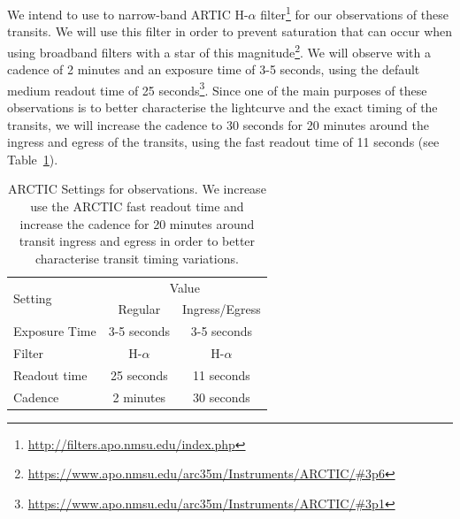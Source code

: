 \documentclass[twocolumn]{aastex631}
\begin{document}
We intend to use to narrow-band ARTIC H-$\alpha$ filter\footnote{\url{http://filters.apo.nmsu.edu/index.php}} for our observations of these transits. We will use this filter in order to prevent saturation that can occur when using broadband filters with a star of this magnitude\footnote{\url{https://www.apo.nmsu.edu/arc35m/Instruments/ARCTIC/\#3p6}}. We will observe with a cadence of 2 minutes and an exposure time of 3-5 seconds, using the default medium readout time of 25 seconds\footnote{\url{https://www.apo.nmsu.edu/arc35m/Instruments/ARCTIC/\#3p1}}. Since one of the main purposes of these observations is to better characterise the lightcurve and the exact timing of the transits, we will increase the cadence to 30 seconds for 20 minutes around the ingress and egress of the transits, using the fast readout time of 11 seconds (see Table~\ref{tab:settings}).

\begin{table}[htb]
    \centering
    \begin{tabular}{l|c|c} 
        \hline
        \multicolumn{1}{l|}{\multirow{2}{*}{Setting}} & \multicolumn{2}{c}{Value}                                         \\ \cline{2-3} 
\multicolumn{1}{l|}{}                         & \multicolumn{1}{c|}{Regular} & \multicolumn{1}{c}{Ingress/Egress} \\
        \hline\hline
        Exposure Time & 3-5 seconds & 3-5 seconds\\
        Filter & H-$\alpha$ & H-$\alpha$ \\
        Readout time & 25 seconds & 11 seconds \\
        Cadence & 2 minutes & 30 seconds \\
        \hline
    \end{tabular}
    \caption{ARCTIC Settings for observations. We increase use the ARCTIC fast readout time and increase the cadence for 20 minutes around transit ingress and egress in order to better characterise transit timing variations.}
    \label{tab:settings}
\end{table}


{}
\end{document}
